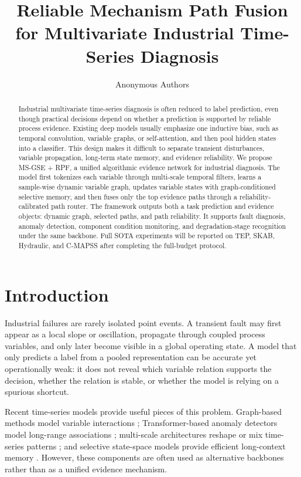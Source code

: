 \documentclass[letterpaper]{article}
\title{Reliable Mechanism Path Fusion for Multivariate Industrial Time-Series Diagnosis}
\author{
    Anonymous Authors
}
\begin{document}
\maketitle

\begin{abstract}
Industrial multivariate time-series diagnosis is often reduced to label prediction, even though practical decisions depend on whether a prediction is supported by reliable process evidence. Existing deep models usually emphasize one inductive bias, such as temporal convolution, variable graphs, or self-attention, and then pool hidden states into a classifier. This design makes it difficult to separate transient disturbances, variable propagation, long-term state memory, and evidence reliability. We propose MS-GSE + RPF, a unified algorithmic evidence network for industrial diagnosis. The model first tokenizes each variable through multi-scale temporal filters, learns a sample-wise dynamic variable graph, updates variable states with graph-conditioned selective memory, and then fuses only the top evidence paths through a reliability-calibrated path router. The framework outputs both a task prediction and evidence objects: dynamic graph, selected paths, and path reliability. It supports fault diagnosis, anomaly detection, component condition monitoring, and degradation-stage recognition under the same backbone. Full SOTA experiments will be reported on TEP, SKAB, Hydraulic, and C-MAPSS after completing the full-budget protocol.
\end{abstract}

\section{Introduction}

Industrial failures are rarely isolated point events. A transient fault may first appear as a local slope or oscillation, propagate through coupled process variables, and only later become visible in a global operating state. A model that only predicts a label from a pooled representation can be accurate yet operationally weak: it does not reveal which variable relation supports the decision, whether the relation is stable, or whether the model is relying on a spurious shortcut.

Recent time-series models provide useful pieces of this problem. Graph-based methods model variable interactions \citep{deng2021gdn}; Transformer-based anomaly detectors model long-range associations \citep{xu2022anomalytransformer,tuli2022tranad}; multi-scale architectures reshape or mix time-series patterns \citep{wu2023timesnet,wang2024timemixer}; and selective state-space models provide efficient long-context memory \citep{gu2024mamba}. However, these components are often used as alternative backbones rather than as a unified evidence mechanism.
\end{document}
